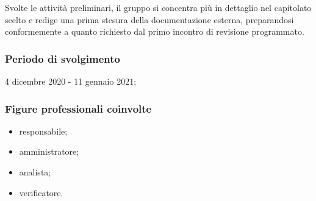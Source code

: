 Svolte le attività preliminari, il gruppo si concentra più in dettaglio nel capitolato scelto e redige una prima stesura della documentazione esterna, preparandosi conformemente a quanto richiesto dal primo incontro di revisione programmato.
        
        \subsubsection{Periodo di svolgimento}
        4 dicembre 2020 - 11 gennaio 2021;
        
        \subsubsection{Figure professionali coinvolte}
            \begin{itemize}
                \item responsabile;
                \item amministratore;
                \item analista;
                \item verificatore.
            \end{itemize}
        

